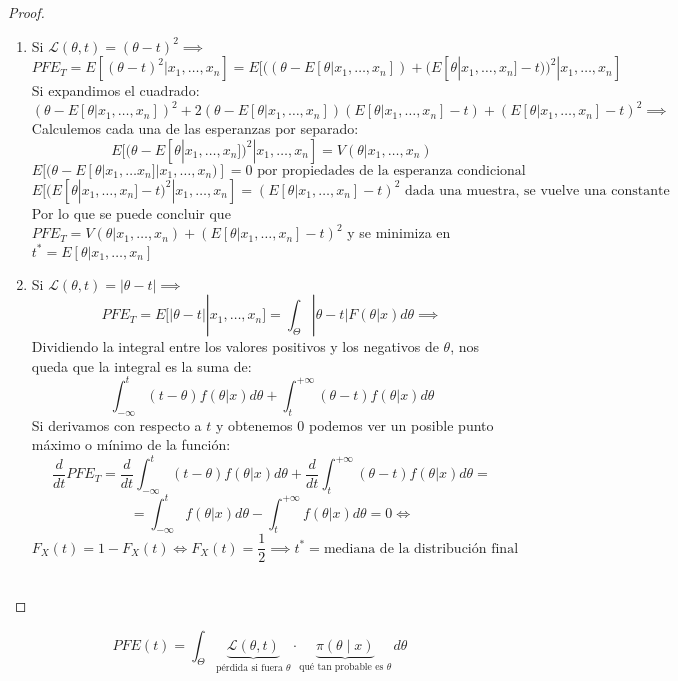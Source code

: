 \begin{proof}
  \begin{enumerate}
    \item Si  $\mathcal{L}(\theta, t) = (\theta - t)^2 \implies$ $$PFE_T = E[(\theta -
                t)^2 | x_1, \ldots, x_n] = E[((\theta - E[\theta | x_1, \ldots, x_n]) +
                (E[\theta | x_1, \ldots, x_n] - t))^2 | x_1, \ldots, x_n] $$ Si expandimos el
          cuadrado: $$ (\theta - E[\theta | x_1, \ldots, x_n])^2 + 2(\theta - E[\theta |
                x_1, \ldots, x_n])(E[\theta | x_1, \ldots, x_n] - t) + (E[\theta | x_1, \ldots,
                x_n] - t)^2 \implies$$ Calculemos cada una de las esperanzas por separado:
          $$E[(\theta - E[\theta | x_1, \ldots, x_n])^2 | x_1, \ldots, x_n] = V(\theta |
            x_1, \ldots, x_n)$$ $$E[(\theta - E[\theta | x_1, \ldots x_n] | x_1, \ldots,
                x_n)] = 0 \text{ por propiedades de la esperanza condicional}$$ $$E[(E[\theta |
                    x_1, \ldots, x_n] - t)^2 | x_1, \ldots, x_n] = (E[\theta | x_1, \ldots, x_n] -
            t)^2 \text{ dada una muestra, se vuelve una constante}$$ Por lo que se puede
          concluir que $PFE_T = V(\theta | x_1, \ldots, x_n) + (E[\theta | x_1, \ldots,
                x_n] - t)^2$ y se minimiza en $t^* = E[\theta | x_1, \ldots, x_n]$
    \item  Si $\mathcal{L}(\theta, t) = |\theta - t| \implies$ $$PFE_T = E[|\theta - t| |
                x_1, \ldots, x_n] = \int_{\Theta} |\theta - t|F(\theta | x)d\theta \implies$$
          Dividiendo la integral entre los valores positivos y los negativos de $\theta$,
          nos queda que la integral es la suma de: $$\int_{-\infty}^{t} (t -
            \theta)f(\theta | x)d\theta + \int_{t}^{+\infty} (\theta - t)f(\theta |
            x)d\theta$$ Si derivamos con respecto a $t$ y obtenemos $0$ podemos ver un
          posible punto máximo o mínimo de la función: $$\frac{d}{dt}PFE_T = \frac{d}{dt}
            \int_{-\infty}^{t} (t - \theta)f(\theta | x)d\theta + \frac{d}{dt}
            \int_{t}^{+\infty} (\theta - t)f(\theta | x)d\theta = $$ $$ =
            \int_{-\infty}^{t} f(\theta | x)d\theta - \int_{t}^{+\infty} f(\theta |
            x)d\theta = 0 \iff$$ $$F_X(t) = 1 - F_X(t) \iff F_X(t) = \frac{1}{2} \implies
            t^* = \text{mediana de la distribución final}$$\

  \end{enumerate}
\end{proof}


\begin{observación}
  $$PFE(t) = \int_{\Theta} \underbrace{\mathcal{L}(\theta, t)}_{\text{pérdida si fuera } \theta}
  \cdot 
  \underbrace{\pi(\theta \mid x)}_{\text{qué tan probable es } \theta}
  \, d\theta$$
\end{observación}

